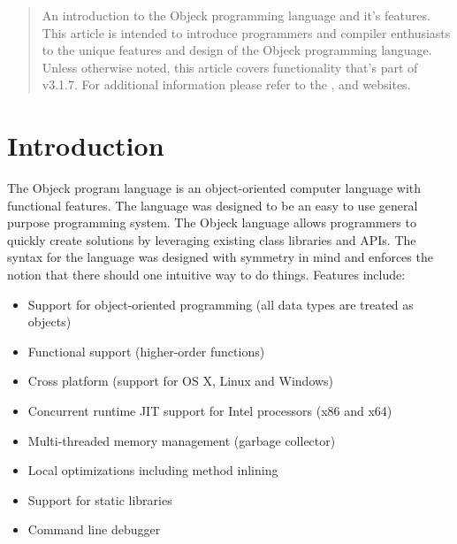 \documentclass[11pt]{article}
\begin{document}
\maketitle
\thispagestyle{empty}

\vspace{\baselineskip}

\begin{abstract}
  An introduction to the Objeck programming language and it's
  features.  This article is intended to introduce programmers and
  compiler enthusiasts to the unique features and design of the Objeck
  programming language.  Unless otherwise noted, this article covers
  functionality that's part of v3.1.7.  For additional information
  please refer to the
  ,
  and
  websites.
\end{abstract}

\newpage
\tableofcontents
\newpage

\label{Introduction}
\section{Introduction}
The Objeck program language is an object-oriented computer language
with functional features.  The language was designed to be an easy to
use general purpose programming system.  The Objeck language allows
programmers to quickly create solutions by leveraging existing class
libraries and APIs.  The syntax for the language was designed with
symmetry in mind and enforces the notion that there should one
intuitive way to do things. Features include:
\begin{itemize}
\item Support for object-oriented programming (all data types are
  treated as objects)
\item Functional support (higher-order functions)
\item Cross platform (support for OS X, Linux and Windows)
\item Concurrent runtime JIT support for Intel processors (x86 and
  x64)
\item Multi-threaded memory management (garbage collector)
\item Local optimizations including method inlining
\item Support for static libraries
\item Command line debugger
\end{itemize}
\end{document}
